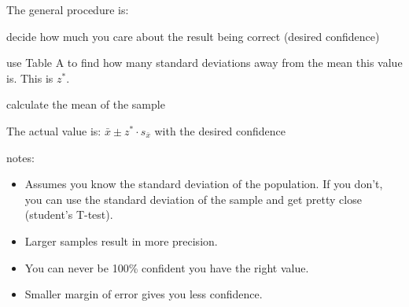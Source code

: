 \documentclass[letterpaper, landscape]{exam}
\begin{document}
  The general procedure is:
  \begin{enumerate*}
    \item decide how much you care about the result being correct (desired
      confidence)

    \item use Table A to find how many standard deviations away from the mean
      this value is. This is $z^*$.

    \item calculate the mean of the sample

    \item The actual value is: $\bar{x} \pm z^* \cdot s_{\bar{x}}$ with the
      desired confidence

  \end{enumerate*}

  notes:
  \begin{itemize}
    \item Assumes you know the standard deviation of the population. If you
      don't, you can use the standard deviation of the sample and get pretty
      close (student's T-test).

    \item Larger samples result in more precision.

    \item You can never be 100\% confident you have the right value.

    \item Smaller margin of error gives you less confidence.
  \end{itemize}
\end{document}
